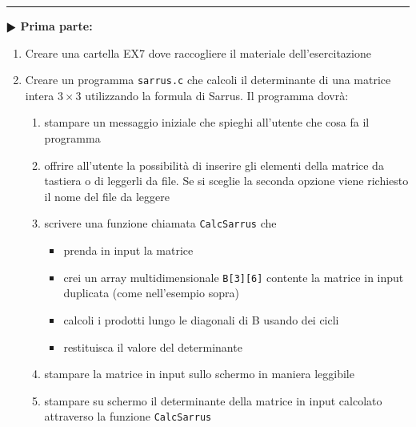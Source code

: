 \documentclass[11pt]{article}
\begin{document}
\vspace{2mm}
\hrule
\vspace{2mm}
\textbf{$\RHD$ Prima parte:}

\begin{enumerate}
\item Creare una cartella EX7 dove raccogliere il materiale dell'esercitazione
\item Creare un programma \texttt{sarrus.c} che calcoli il determinante di una matrice intera $3 \times 3$ 
utilizzando la formula di Sarrus. Il programma dovr\`{a}:
\begin{enumerate}
\item stampare un messaggio iniziale che spieghi all'utente che cosa fa il programma
\item offrire all'utente la possibilit\`{a} di inserire gli elementi della matrice da tastiera 
o di leggerli da file. Se si sceglie la seconda opzione viene richiesto il nome del file  da leggere 
\item scrivere una funzione chiamata \texttt{CalcSarrus} che 
\begin{itemize}
\item prenda in input la matrice
\item crei un array multidimensionale \texttt{B[3][6]} contente 
la matrice in input duplicata (come nell'esempio sopra)
\item calcoli i prodotti lungo le diagonali di B usando dei cicli
\item restituisca il valore del determinante
\end{itemize}
\item stampare la matrice in input sullo schermo in maniera leggibile
\item stampare su schermo il determinante della matrice in input calcolato attraverso la funzione \texttt{CalcSarrus}
\end{enumerate}
\end{enumerate}
\end{document}
